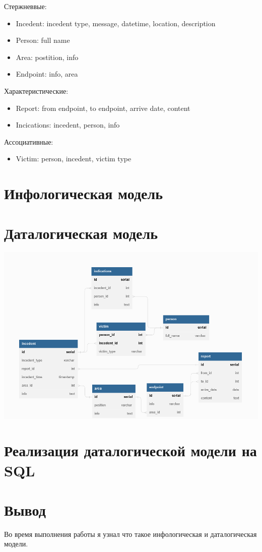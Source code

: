 \documentclass{article}
\begin{document}
Стержневвые:
\begin{itemize}
  \item Incedent: incedent type, message, datetime, location, description
  \item Person: full name
  \item Area: postition, info
  \item Endpoint: info, area
\end{itemize}
Характеристические:
\begin{itemize}
  \item Report: from endpoint, to endpoint, arrive date, content
  \item Incications: incedent, person, info
\end{itemize}
Ассоциативные:
\begin{itemize}
  \item Victim: person, incedent, victim type
\end{itemize}
\section{Инфологическая модель}

\section{Даталогическая модель}
\includegraphics[width=\textwidth]{dbdiagram.png}

\section{Реализация даталогической модели на SQL}

\lstset{language=SQL}

\section{Вывод}
Во время выполнения работы я узнал что такое инфологическая и даталогическая модели.
\end{document}
